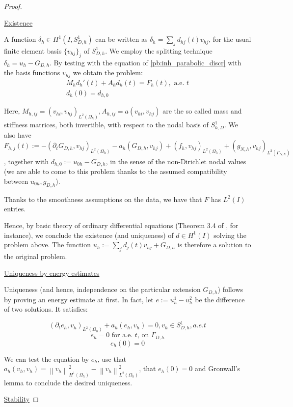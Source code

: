 \documentclass[english,a4paper,10pt,oneside]{scrbook}	%
\theoremstyle{break}
\newenvironment{mproof}[1][\proofname]{%
  \begin{proof}[#1]$ $\par\nobreak\ignorespaces
}{%
  \end{proof}
}
\renewcommand*{\proofname}{Proof}
\theoremstyle{remark}
\newcommand{\norm}[1]{\left\lVert#1\right\rVert}
\begin{document}
\begin{mproof}

\underline{Existence}

A function $\delta_h \in H^1(I, S^1_{D,h})$ can be written as $\delta_h=\sum_j d_{hj}(t)v_{hj}$, for the usual finite element basis $\{v_{hj}\}_j$ of $S^1_{D,h}$. We employ the splitting technique $\delta_h = u_h - G_{D,h}$. By testing with the equation of \cref{pb:inh_parabolic_discr} with the basis functions $v_{hj}$ we obtain the problem:
\begin{align}
\label{eqn:ode}
	M_h d_h'(t)+A_hd_h(t)= F_h(t), \text{ a.e. } t\\
	d_h(0) = d_{h,0}	
\end{align}

Here, $M_{h,ij} = (v_{hi}, v_{hj})_{L^2(\Omega_h)}, A_{h,ij} = a(v_{hi}, v_{hj})$ are the so called mass and stiffness matrices, both invertible, with respect to the nodal basis of $S^1_{h,D}$. We also have $F_{h,j}(t):= - (\partial_t G_{D,h}, v_{hj})_{L^2(\Omega_h)} - a_h(G_{D,h}, v_{hj}) + (f_h, v_{hj})_{L^2(\Omega_h)} + (g_{N,h}, v_{hj})_{L^2(\Gamma_{N,h})}$, together with $d_{h,0}:= u_{0h} - G_{D,h}$, in the sense of the non-Dirichlet nodal values (we are able to come to this problem thanks to the assumed compatibility between $u_{0h}, g_{D,h}$).

Thanks to the smoothness assumptions on the data, we have that $F$ has $L^2(I)$ entries.

Hence, by basic theory of ordinary differential equations (Theorem 3.4 of \cite{odes}, for instance), we conclude the existence (and uniqueness) of $d \in H^1(I)$ solving the problem above. The function $u_h:=\sum_j d_j(t)v_{hj} + G_{D,h}$ is therefore a solution to the original problem. 

\underline{Uniqueness by energy estimates}

Uniqueness (and hence, independence on the particular extension $G_{D,h}$) follows by proving an energy estimate at first. In fact, let $e:=u_h^1-u_h^2$ be the difference of two solutions. It satisfies:

$$(\partial_t e_h, v_h)_{L^2(\Omega_h)} + a_h(e_h, v_h) = 0 , v_h \in S^1_{D,h}, a.e. t$$
$$e_h=0 \text{ for a.e. }t \text{,  on } \Gamma_{D,h}$$
$$e_h(0)=0$$

We can test the equation by $e_h$, use that $a_h(v_h,v_h) = \norm{v_h}_{H^1(\Omega_h)}^2-\norm{v_h}_{L^2(\Omega_h)}^2$, that $e_h(0)=0$ and Gronwall's lemma to conclude the desired uniqueness.

\underline{Stability}


\end{mproof}
\end{document}
